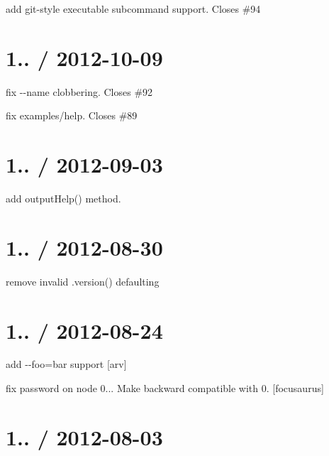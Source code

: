 \begin{DoxyItemize}
\item add git-\/style executable subcommand support. Closes \#94
\end{DoxyItemize}

\section*{1.. / 2012-\/10-\/09 }


\begin{DoxyItemize}
\item fix {\ttfamily -\/-\/name} clobbering. Closes \#92
\item fix examples/help. Closes \#89
\end{DoxyItemize}

\section*{1.. / 2012-\/09-\/03 }


\begin{DoxyItemize}
\item add {\ttfamily output\+Help()} method.
\end{DoxyItemize}

\section*{1.. / 2012-\/08-\/30 }


\begin{DoxyItemize}
\item remove invalid .version() defaulting
\end{DoxyItemize}

\section*{1.. / 2012-\/08-\/24 }


\begin{DoxyItemize}
\item add {\ttfamily -\/-\/foo=bar} support \mbox{[}arv\mbox{]}
\item fix password on node 0... Make backward compatible with 0. \mbox{[}focusaurus\mbox{]}
\end{DoxyItemize}

\section*{1.. / 2012-\/08-\/03 }


